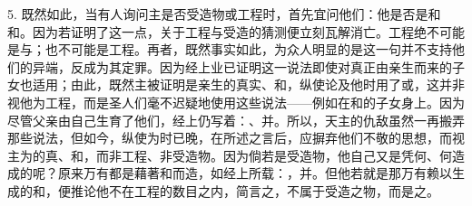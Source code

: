 5. 既然如此，当有人询问主是否受造物或工程时，首先宜问他们：他是否是和和。因为若证明了这一点，关于工程与受造的猜测便立刻瓦解消亡。工程绝不可能是与；也不可能是工程。再者，既然事实如此，为众人明显的是这一句并不支持他们的异端，反成为其定罪。因为经上业已证明这一说法即使对真正由亲生而来的子女也适用；由此，既然主被证明是亲生的真实、和，纵使论及他时用了或，这并非视他为工程，而是圣人们毫不迟疑地使用这些说法——例如在和的子女身上。因为尽管父亲由自己生育了他们，经上仍写着：、并。所以，天主的仇敌虽然一再搬弄那些说法，但如今，纵使为时已晚，在所述之言后，应摒弃他们不敬的思想，而视主为的真、和，而非工程、非受造物。因为倘若是受造物，他自己又是凭何、何造成的呢？原来万有都是藉著和而造，如经上所载：，并。但他若就是那万有赖以生成的和，便推论他不在工程的数目之内，简言之，不属于受造之物，而是之。\par

